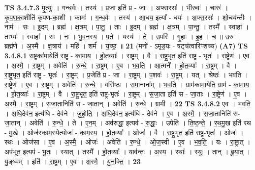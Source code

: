 \documentclass[17pt]{extarticle}
\begin{document}
                  \newline
                                \textbf{ TS 3.4.7.3} \newline
                  मृ॒त्युः । ग॒न्ध॒र्वः । तस्य॑ । प्र॒जा इति॑ प्र - जाः । अ॒फ्स॒रसः॑ । भी॒रुवः॑ । चारुः॑ । कृ॒प॒ण॒का॒शीति॑ कृपण-का॒शी । कामः॑ । ग॒न्ध॒र्वः । तस्य॑ । आ॒धय॒ इत्या᳚ - धयः॑ । अ॒फ्स॒रसः॑ । शो॒चय॑न्तीः । नाम॑ । सः । इ॒दम् । ब्रह्म॑ । क्ष॒त्रम् । पा॒तु॒ । ताः । इ॒दम् । ब्रह्म॑ । क्ष॒त्रम् । पा॒न्तु॒ । तस्मै᳚ । स्वाहा᳚ । ताभ्यः॑ । स्वाहा᳚ । सः । नः॒ । भु॒व॒न॒स्य॒ । प॒ते॒ । यस्य॑ । ते॒ । उ॒परि॑ । गृ॒हाः । इ॒ह । च॒ ॥ उ॒रु । ब्रह्म॑णे । अ॒स्मै । क्ष॒त्राय॑ । महि॑ । शर्म॑ । य॒च्छ॒ ॥ \textbf{  21} \newline
                  \newline
                      (मनो॑ - ऽमृड॒यः - षट्च॑त्वारिꣳशच्च)  \textbf{(A7)} \newline \newline
                                \textbf{ TS 3.4.8.1} \newline
                  रा॒ष्ट्रका॑मा॒येति॑ रा॒ष्ट्र - का॒मा॒य॒ । हो॒त॒व्याः᳚ । रा॒ष्ट्रम् । वै । रा॒ष्ट्र॒भृत॒ इति॑ राष्ट्र - भृतः॑ । रा॒ष्ट्रेण॑ । ए॒व । अ॒स्मै॒ । रा॒ष्ट्रम् । अवेति॑ । रु॒न्धे॒ । रा॒ष्ट्रम् । ए॒व । भ॒व॒ति॒ । आ॒त्मने᳚ । हो॒त॒व्याः᳚ । रा॒ष्ट्रम् । वै । रा॒ष्ट्र॒भृत॒ इति॑ राष्ट्र - भृतः॑ । रा॒ष्ट्रम् । प्र॒जेति॑ प्र - जा । रा॒ष्ट्रम् । प॒शवः॑ । रा॒ष्ट्रम् । यत् । श्रेष्ठः॑ । भव॑ति । रा॒ष्ट्रेण॑ । ए॒व । रा॒ष्ट्रम् । अवेति॑ । रु॒न्धे॒ । वसि॑ष्ठः । स॒मा॒नाना᳚म् । भ॒व॒ति॒ । ग्राम॑कामा॒येति॒ ग्राम॑ - का॒मा॒य॒ । हो॒त॒व्याः᳚ । रा॒ष्ट्रम् । वै । रा॒ष्ट्र॒भृत॒ इति॑ राष्ट्र-भृतः॑ । रा॒ष्ट्रम् । स॒जा॒ता इति॑ स - जा॒ताः । रा॒ष्ट्रेण॑ । ए॒व । अ॒स्मै॒ । रा॒ष्ट्रम् । स॒जा॒तानिति॑ स - जा॒तान् । अवेति॑ । रु॒न्धे॒ । ग्रा॒मी । \textbf{  22} \newline
                  \newline
                                \textbf{ TS 3.4.8.2} \newline
                  ए॒व । भ॒व॒ति॒ । अ॒धि॒देव॑न॒ इत्य॑धि - देव॑ने । जु॒हो॒ति॒ । अ॒धि॒देव॑न॒ इत्य॑धि - देव॑ने । ए॒व । अ॒स्मै॒ । स॒जा॒तानिति॑ स-जा॒तान् । अवेति॑ । रु॒न्धे॒ । ते । ए॒न॒म् । अव॑रुद्धा॒ इत्यव॑ - रु॒द्धाः॒ । उपेति॑ । ति॒ष्ठ॒न्ते॒ । र॒थ॒मु॒ख इति॑ रथ - मु॒खे । ओज॑स्काम॒स्येत्योजः॑ - का॒म॒स्य॒ । हो॒त॒व्याः᳚ । ओजः॑ । वै । रा॒ष्ट्र॒भृत॒ इति॑ राष्ट्र-भृतः॑ । ओजः॑ । रथः॑ । ओज॑सा । ए॒व । अ॒स्मै॒ । ओजः॑ । अवेति॑ । रु॒न्धे॒ । ओ॒ज॒स्वी । ए॒व । भ॒व॒ति॒ । यः । रा॒ष्ट्रात् । अप॑भूत॒ इत्यप॑ - भू॒तः॒ । स्यात् । तस्मै᳚ । हो॒त॒व्याः᳚ । याव॑न्तः । अ॒स्य॒ । रथाः᳚ । स्युः । तान् । ब्रू॒या॒त् । यु॒ङ्ध्वम् । इति॑ । रा॒ष्ट्रम् । ए॒व । अ॒स्मै॒ । यु॒न॒क्ति॒ । \textbf{  23} \newline
\end{document}
